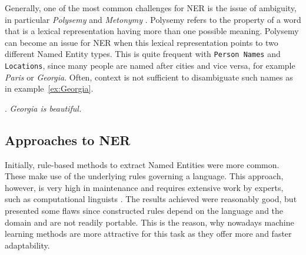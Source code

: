 \documentclass[11pt]{article}
\begin{document}
Generally, one of the most common challenges for NER is the issue of ambiguity, in particular \emph{Polysemy} and \emph{Metonymy} \cite{nadeau2007survey}.
Polysemy refers to the property of a word that is a lexical representation having more than one possible meaning. Polysemy can become an issue for NER when this lexical representation points to two different Named Entity types.
This is quite frequent with \texttt{Person Names} and \texttt{Locations}, since many people are named after cities and vice versa, for example \emph{Paris} or \emph{Georgia}. 
Often, context is not sufficient to disambiguate such names as in example~\ref{ex:Georgia}.

\ex. \emph{Georgia is beautiful.} \label{ex:Georgia}




\subsection{Approaches to NER}

Initially, rule-based methods to extract Named Entities were more common. These make use of the underlying rules governing a language.
This approach, however, is very high in maintenance and requires extensive work by experts, such as computational linguists \cite{nadeau2007survey}.
The results achieved were reasonably good, but presented some flaws since constructed rules depend on the language and  the domain and are not readily portable. 
This is the reason, why nowadays machine learning methods are more attractive for this task as they offer more and faster adaptability. 
\end{document}
